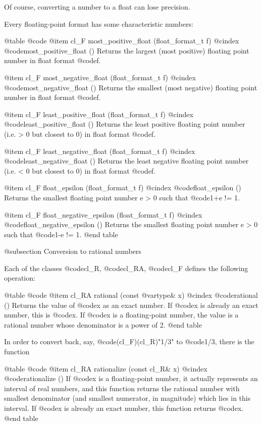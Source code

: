 Of course, converting a number to a float can lose precision.

Every floating-point format has some characteristic numbers:

@table @code
@item cl_F most_positive_float (float_format_t f)
@cindex @code{most_positive_float ()}
Returns the largest (most positive) floating point number in float format @code{f}.

@item cl_F most_negative_float (float_format_t f)
@cindex @code{most_negative_float ()}
Returns the smallest (most negative) floating point number in float format @code{f}.

@item cl_F least_positive_float (float_format_t f)
@cindex @code{least_positive_float ()}
Returns the least positive floating point number (i.e. > 0 but closest to 0)
in float format @code{f}.

@item cl_F least_negative_float (float_format_t f)
@cindex @code{least_negative_float ()}
Returns the least negative floating point number (i.e. < 0 but closest to 0)
in float format @code{f}.

@item cl_F float_epsilon (float_format_t f)
@cindex @code{float_epsilon ()}
Returns the smallest floating point number e > 0 such that @code{1+e != 1}.

@item cl_F float_negative_epsilon (float_format_t f)
@cindex @code{float_negative_epsilon ()}
Returns the smallest floating point number e > 0 such that @code{1-e != 1}.
@end table


@subsection Conversion to rational numbers

Each of the classes @code{cl_R}, @code{cl_RA}, @code{cl_F}
defines the following operation:

@table @code
@item cl_RA rational (const @var{type}& x)
@cindex @code{rational ()}
Returns the value of @code{x} as an exact number. If @code{x} is already
an exact number, this is @code{x}. If @code{x} is a floating-point number,
the value is a rational number whose denominator is a power of 2.
@end table

In order to convert back, say, @code{(cl_F)(cl_R)"1/3"} to @code{1/3}, there is
the function

@table @code
@item cl_RA rationalize (const cl_R& x)
@cindex @code{rationalize ()}
If @code{x} is a floating-point number, it actually represents an interval
of real numbers, and this function returns the rational number with
smallest denominator (and smallest numerator, in magnitude)
which lies in this interval.
If @code{x} is already an exact number, this function returns @code{x}.
@end table

